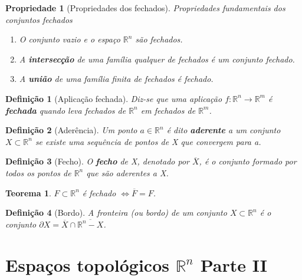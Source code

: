 \documentclass{article}
\newtheorem{prop}{Propriedade}
\newtheorem{theorem}{Teorema}
\newtheorem{definition}{Definição}
\begin{document}
\begin{prop}[Propriedades dos fechados]
Propriedades fundamentais dos conjuntos fechados

\begin{enumerate}
    \item O conjunto vazio e o espaço $\mathbb{R}^n$ são fechados.
    
    \item A \textbf{intersecção} de uma família qualquer de fechados é um conjunto fechado.
    
    \item A \textbf{união} de uma família finita de fechados é fechado.
\end{enumerate}
\end{prop}

\begin{definition}[Aplicação fechada]
Diz-se que uma aplicação $f: \mathbb{R}^n \rightarrow \mathbb{R}^m$ é \textbf{fechada} quando leva fechados de $\mathbb{R}^n$ em fechados de $\mathbb{R}^m$.
\end{definition}

\begin{definition}[Aderência]
Um ponto $a \in \mathbb{R}^n$ é dito \textbf{aderente} a um conjunto $X \subset \mathbb{R}^n$ se existe uma sequência de pontos de X que convergem para a.
\end{definition}

\begin{definition}[Fecho]
O \textbf{fecho} de X, denotado por $\overline{X}$, é o conjunto formado por todos os pontos de $\mathbb{R}^n$ que são aderentes a X.
\end{definition}

\begin{theorem}
$F \subset \mathbb{R}^n$ é fechado $\Longleftrightarrow \overline{F} = F$.
\end{theorem}

\begin{definition}[Bordo]
A fronteira (ou bordo) de um conjunto $X \subset \mathbb{R}^n$ é o conjunto $\partial X = \overline{X} \cap \overline{\mathbb{R}^n - X}$.
\end{definition}

\section*{Espaços topológicos $\mathbb{R}^n$ Parte II}
\label{s10}
\end{document}
